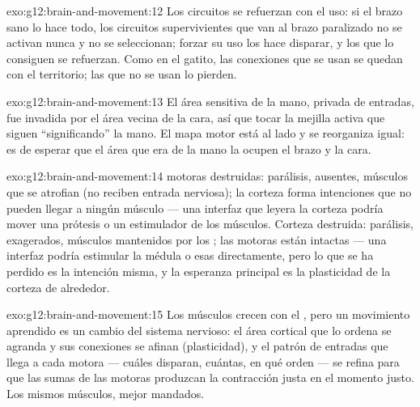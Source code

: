 \begin{solution}{exo:g12:brain-and-movement:12}
Los circuitos se refuerzan con el uso: si el brazo sano lo hace todo,
los circuitos supervivientes que van al brazo paralizado no se activan
nunca y no se seleccionan; forzar su uso los hace disparar, y los que
lo consiguen se refuerzan. Como en el gatito, las conexiones que se
usan se quedan con el territorio; las que no se usan lo pierden.
\end{solution}

\begin{solution}{exo:g12:brain-and-movement:13}
El área sensitiva de la mano, privada de entradas, fue invadida por el
área vecina de la cara, así que tocar la mejilla activa  que
siguen ``significando'' la mano. El mapa motor está al lado y se
reorganiza igual: es de esperar que el área que era de la mano la
ocupen el brazo y la cara.
\end{solution}

\begin{solution}{exo:g12:brain-and-movement:14}
 motoras destruidas: parálisis,  ausentes, músculos que
se atrofian (no reciben entrada nerviosa); la corteza forma intenciones
que no pueden llegar a ningún músculo --- una interfaz que leyera la
corteza podría mover una prótesis o un estimulador de los músculos.
Corteza destruida: parálisis,  exagerados, músculos mantenidos
por los ; las  motoras están intactas --- una interfaz
podría estimular la médula o esas  directamente, pero lo que se
ha perdido es la intención misma, y la esperanza principal es la
plasticidad de la corteza de alrededor.
\end{solution}

\begin{solution}{exo:g12:brain-and-movement:15}
Los músculos crecen con el , pero un movimiento aprendido
es un cambio del sistema nervioso: el área cortical que lo ordena se
agranda y sus conexiones se afinan (plasticidad), y el patrón de
entradas que llega a cada  motora --- cuáles disparan, cuántas,
en qué orden --- se refina para que las sumas de las  motoras
produzcan la contracción justa en el momento justo. Los mismos
músculos, mejor mandados.
\end{solution}

